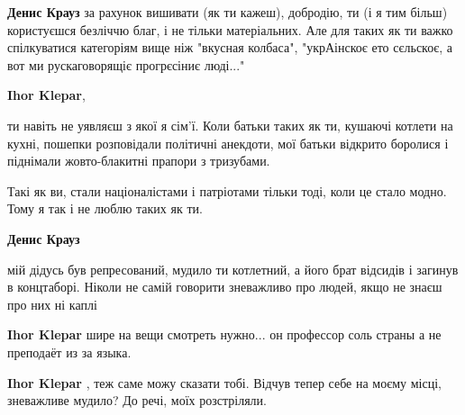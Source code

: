 \begin{itemize}
\begin{itemize}
\textbf{Денис Крауз} за рахунок вишивати (як ти кажеш), добродію, ти (і я тим більш) користуєшся безліччю благ, і не тільки матеріальних. Але для таких як ти важко спілкуватися категоріям вище ніж "вкусная колбаса", "укрАінскоє ето сєльскоє, а вот ми рускаговорящіє прогрєсіниє люді..."

 
\textbf{Ihor Klepar}, 

ти навіть не уявляєш з якої я сім'ї. Коли батьки таких як ти, кушаючі котлети
на кухні, пошепки розповідали політичні анекдоти, мої батьки відкрито боролися
і піднімали жовто-блакитні прапори з тризубами.

Такі як ви, стали націоналістами і патріотами тільки тоді, коли це стало модно.
Тому я так і не люблю таких як ти.


 
\textbf{Денис Крауз} 

мій дідусь був репресований, мудило ти котлетний, а його брат відсидів і
загинув в концтаборі. Ніколи не самій говорити зневажливо про людей, якщо не
знаєш про них ні каплі


 
\textbf{Ihor Klepar} шире на вещи смотреть нужно... он профессор соль страны а не преподаёт из за языка.

 
\textbf{Ihor Klepar} , теж саме можу сказати тобі. Відчув тепер себе на моєму місці, зневажливе мудило?
До речі, моїх розстріляли.

 

\end{itemize}
\end{itemize}
